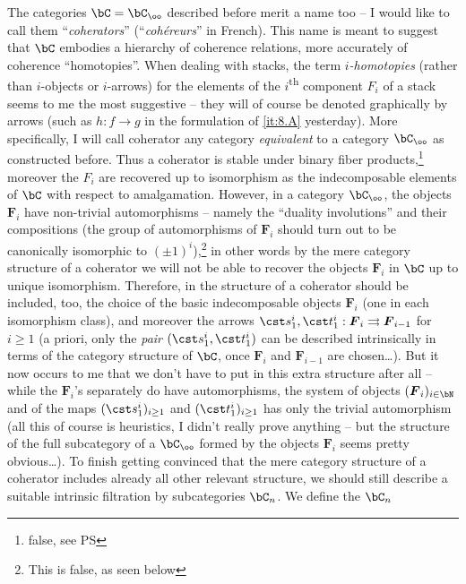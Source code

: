 The categories $\bC=\bC_\oo$ described before merit a name too
-- I would like to call them ``\emph{coherators}'' (``\emph{coh\'ereurs}'' in
French). This name is meant to suggest that $\bC$ embodies a
hierarchy of coherence relations, more accurately of coherence
``homotopies''. When dealing with stacks, the term
\emph{$i$-homotopies} (rather than $i$-objects or $i$-arrows) for the
elements of the $i$\textsuperscript{th} component $F_i$ of a stack
seems to me the most suggestive -- they will of course be denoted
graphically by arrows (such as $h: f\to g$ in the
formulation of \ref{it:8.A} yesterday). More specifically, I will call
coherator any category \emph{equivalent} to a category $\bC_\oo$ as
constructed before. Thus a coherator is stable under binary fiber
products,\footnote{false, see PS} moreover the $F_i$ are recovered up
to isomorphism as the indecomposable elements of $\bC$ with respect
to amalgamation. However, in a category $\bC_\oo$, the objects
$\boldsymbol F_i$ have non-trivial automorphisms -- namely the ``duality
involutions'' and their compositions (the group of automorphisms of
$\boldsymbol F_i$ should turn out to be canonically isomorphic to
$(\pm1)^i$),\footnote{This is false, as seen below} in other words by the mere
category structure of a coherator we will not be able to recover the
objects $\boldsymbol F_i$ in $\bC$ up to unique isomorphism. Therefore, in
the structure of a coherator should be included, too, the choice of
the basic indecomposable objects $\boldsymbol F_i$ (one in each isomorphism
class), and moreover the arrows $\cst s_1^i,\cst t_1^i : \boldsymbol F_i
\rightrightarrows \boldsymbol F_{i-1}$ for $i\ge1$ (a priori, only the
\emph{pair} $(\cst s_1^i,\cst t_1^i)$ can be described intrinsically
in terms of the category structure of $\bC$, once $\boldsymbol F_i$ and
$\boldsymbol F_{i-1}$ are chosen\ldots). But it now occurs to me that we
don't have to put in this extra structure after all -- while the
$\boldsymbol F_i$'s separately do have automorphisms, the system of objects
$(\boldsymbol F_i)_{i\in\bN}$ and of the maps $(\cst s_1^i)_{i\ge1}$ and $(\cst
t_1^i)_{i\ge1}$ has only the trivial automorphism (all this of course
is heuristics, I didn't really prove anything -- but the structure of
the full subcategory of a $\bC_\oo$ formed by the objects $\boldsymbol F_i$ seems
pretty obvious\ldots). To finish getting convinced that the
mere category structure of a coherator includes already all other
relevant structure, we should still describe a suitable intrinsic
filtration by subcategories $\bC_n$. We define the $\bC_n$
